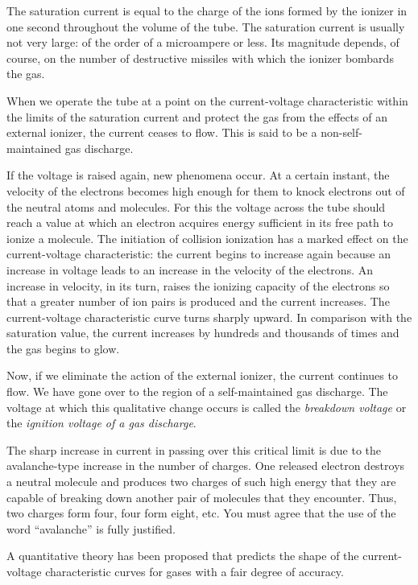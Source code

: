 The saturation current is equal to the charge of the ions formed by the ionizer in one second throughout the volume of the tube. The saturation current is usually not very large: of the order of a microampere or less. Its magnitude depends, of course, on the number of destructive missiles with which the ionizer bombards the gas.

When we operate the tube at a point on the current-voltage characteristic within the limits of the saturation current and protect the gas from the effects of an external ionizer, the current ceases to flow. This is said to be a non-self-maintained gas discharge.

If the voltage is raised again, new phenomena occur. At a certain instant, the velocity of the electrons becomes high enough for them to knock electrons out of the neutral atoms and molecules. For this the voltage across the tube should reach a value at which an electron acquires energy sufficient in its free path to ionize a molecule. The initiation of collision ionization has a marked effect on the current-voltage characteristic: the current begins to increase again because an increase in voltage leads to an increase in the velocity of the electrons. An increase in velocity, in its turn, raises the ionizing capacity of the electrons so that a greater number of ion pairs is produced and the current increases. The current-voltage characteristic curve turns sharply upward. In comparison with the saturation value, the current increases by hundreds and thousands of times and the gas begins to glow.

Now, if we eliminate the action of the external ionizer, the current continues to flow. We have gone over to the region of a self-maintained gas discharge. The voltage at which this qualitative change occurs is called the \emph{breakdown voltage} or the \emph{ignition voltage of a gas discharge}.

The sharp increase in current in passing over this critical limit is due to the avalanche-type increase in the number of charges. One released electron destroys a neutral molecule and produces two charges of such high energy that they are capable of breaking down another pair of molecules that they encounter. Thus, two charges form four, four form eight, etc. You must agree that the use of the word ``avalanche'' is fully justified. 

A quantitative theory has been proposed that predicts the shape of the current-voltage characteristic curves for gases with a fair degree of accuracy.

